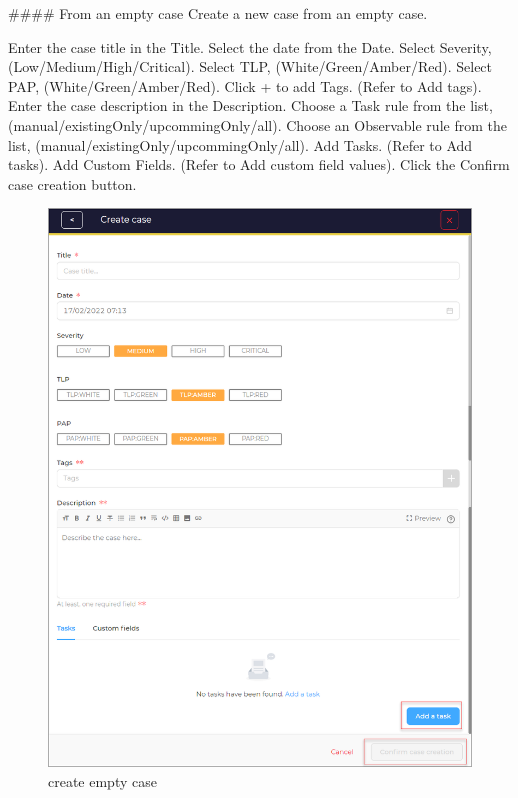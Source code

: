 \begin{markdown}
#### From an empty case
Create a new case from an empty case.

Enter the case title in the Title.
Select the date from the Date.
Select Severity, (Low/Medium/High/Critical).
Select TLP, (White/Green/Amber/Red).
Select PAP, (White/Green/Amber/Red).
Click + to add Tags. (Refer to Add tags).
Enter the case description in the Description.
Choose a Task rule from the list, (manual/existingOnly/upcommingOnly/all).
Choose an Observable rule from the list, (manual/existingOnly/upcommingOnly/all).
Add Tasks. (Refer to Add tasks).
Add Custom Fields. (Refer to Add custom field values).
Click the Confirm case creation button.
\end{markdown}

\begin{figure}[H]
    \centering
    \includegraphics[width=\textwidth]{images/docs/analyst/cases/create/create_empty_case.png}
    \caption{create empty case }
    \label{fig:modules}
\end{figure}

